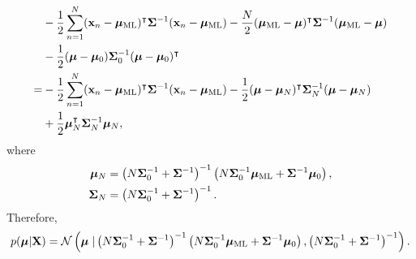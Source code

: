 \begin{equation}
\begin{aligned}
&-
\frac{1}{2}
\sum_{n = 1}^{N}
(\mathbf{x}_n - \bm{\mu}_{\rm ML}) ^ \intercal
\bm{\Sigma} ^ {- 1}
(\mathbf{x}_n - \bm{\mu}_{\rm ML})
-
\frac{N}{2}
(\bm{\mu}_{\rm ML} - \bm{\mu}) ^ \intercal
\bm{\Sigma} ^ {- 1}
(\bm{\mu}_{\rm ML} - \bm{\mu}) 
\\
&-
\frac{1}{2}
(\bm{\mu} - \bm{\mu}_0)
\bm{\Sigma}_0 ^ {- 1}
(\bm{\mu} - \bm{\mu}_0) ^ \intercal 
\\
=&
-
\frac{1}{2}
\sum_{n = 1}^{N}
(\mathbf{x}_n - \bm{\mu}_{\rm ML}) ^ \intercal
\bm{\Sigma} ^ {- 1}
(\mathbf{x}_n - \bm{\mu}_{\rm ML})
-
\frac{1}{2} 
(\bm{\mu} - \bm{\mu}_N) ^ \intercal
\bm{\Sigma}_N ^ {- 1}
(\bm{\mu} - \bm{\mu}_N) 
\\
&+
\frac{1}{2} 
\bm{\mu}_N ^ \intercal
\bm{\Sigma}_N ^ {- 1}
\bm{\mu}_N,
\end{aligned}
\end{equation}
%
where
%
\begin{equation}
\begin{aligned}
\bm{\mu}_N
&= 
\left(
	N \bm{\Sigma}_0 ^ {- 1}
	+
	\bm{\Sigma} ^ {- 1}
\right) ^ {- 1} 
\left(
	N \bm{\Sigma}_0 ^ {- 1}
	\bm{\mu}_{\rm ML}
	+
	\bm{\Sigma} ^ {- 1}
	\bm{\mu}_0	
\right),
\\
\bm{\Sigma}_N
&= 
\left(
	N \bm{\Sigma}_0 ^ {- 1}
	+
	\bm{\Sigma} ^ {- 1}
\right) ^ {- 1}.
\end{aligned}
\end{equation}
%
Therefore,
%
\begin{equation}
p(\bm{\mu} | \mathbf{X})
= 
\mathcal{N}
\left( 
	\bm{\mu}
	\left.
	\right \vert
	\left(
		N \bm{\Sigma}_0 ^ {- 1}
		+
		\bm{\Sigma} ^ {- 1}
	\right) ^ {- 1} 
	\left(
		N \bm{\Sigma}_0 ^ {- 1}
		\bm{\mu}_{\rm ML}
		+
		\bm{\Sigma} ^ {- 1}
		\bm{\mu}_0	
	\right),
	\left(
		N \bm{\Sigma}_0 ^ {- 1}
		+
		\bm{\Sigma} ^ {- 1}
	\right) ^ {- 1}
\right).
\end{equation}
%


